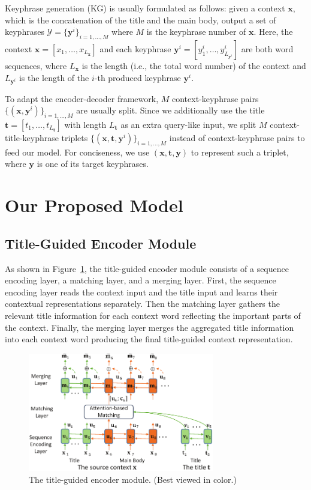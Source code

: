 \documentclass[letterpaper]{article} %
\begin{document}
Keyphrase generation (KG) is usually formulated as follows: given a context $\mathbf{x}$, which is the concatenation of the title and the main body, output a set of keyphrases $\mathcal{Y}=\{\mathbf{y}^i\}_{i=1,\dots,M}$ where $M$ is the keyphrase number of $\mathbf{x}$.
Here, the context $\mathbf{x}=[x_1,\dots,x_{L_{\mathbf{x}}}]$ and each keyphrase $\mathbf{y}^i=[y_1^i,\dots,y^i_{L_{\mathbf{y}^i}}]$ are both word sequences, where $L_{\mathbf{x}}$ is the length (i.e., the total word number) of the context and $L_{\mathbf{y}^i}$ is the length of the $i$-th produced keyphrase $\mathbf{y}^i$.

To adapt the encoder-decoder framework, $M$ context-keyphrase pairs $\{(\mathbf{x}, \mathbf{y}^i)\}_{i=1,\dots,M}$ are usually split. Since we additionally use the title $\mathbf{t}=[t_1,\dots,t_{L_{\mathbf{t}}}]$ with length $L_{\mathbf{t}}$ as an extra query-like input, we split $M$ context-title-keyphrase triplets $\{(\mathbf{x}, \mathbf{t}, \mathbf{y}^i)\}_{i=1,\dots,M}$ instead of context-keyphrase pairs to feed our model. For conciseness, we use $(\mathbf{x}, \mathbf{t}, \mathbf{y})$ to represent such a triplet, where $\mathbf{y}$ is one of its target keyphrases.

\section{Our Proposed Model} \label{section: proposed_model}
\subsection{Title-Guided Encoder Module}
As shown in Figure~\ref{figure: title-guided encoder module}, the title-guided encoder module consists of a sequence encoding layer, a matching layer, and a merging layer. First, the sequence encoding layer reads the context input and the title input and learns their contextual representations separately. Then the matching layer gathers the relevant title information for each context word reflecting the important parts of the context. Finally, the merging layer merges the aggregated title information into each context word producing the final title-guided context representation.

\begin{figure}[t]
\centering
\includegraphics[width=3.2in]{figures/PaperID3210_TGNet_encoding_module_cmyk.pdf}
\caption{The title-guided encoder module. (Best viewed in color.)}
\label{figure: title-guided encoder module}
\end{figure}
\end{document}
